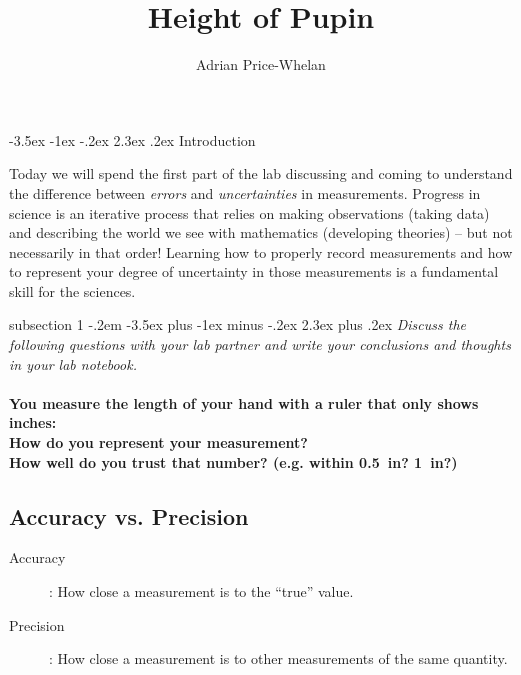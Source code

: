 \documentclass[12pt]{article}
\makeatletter
\newenvironment{problem}{\@startsection
       {subsection}
       {1}
       {-.2em}
       {-3.5ex plus -1ex minus -.2ex}
       {2.3ex plus .2ex}
       {\pagebreak[3]%
       \normalsize\bf\noindent{Problem }
       }
       }
       {%
       }
\renewcommand\section{\@startsection{section}{1}{\z@}%
                                  {-3.5ex \@plus -1ex \@minus -.2ex}%
                                  {2.3ex \@plus.2ex}%
                                  {\normalfont\large\bfseries}}
\makeatother
\begin{document}
\title{Height of Pupin}
\author{Adrian Price-Whelan}
\date{}%

\maketitle

\thispagestyle{empty}

\section{Introduction}

\indent\indent Today we will spend the first part of the lab discussing and coming to understand the difference between \emph{errors} and \emph{uncertainties} in measurements. Progress in science is an iterative process that relies on making observations (taking data) and describing the world we see with mathematics (developing theories) -- but not necessarily in that order! Learning how to properly record measurements and how to represent your degree of uncertainty in those measurements is a fundamental skill for the sciences.  

\begin{problem}{ }
	\textit{Discuss the following questions with your lab partner and write your conclusions and thoughts in your lab notebook.}  \\ \\
	\textbf{You measure the length of your hand with a ruler that only shows inches: } \\
	\indent\textbf{How do you represent your measurement?} \\
	\indent\textbf{How well do you trust that number? (e.g. within 0.5~in? 1~in?)} 
\end{problem}

\subsection{Accuracy vs. Precision}
\begin{description}
	\item[Accuracy]: How close a measurement is to the ``true'' value.
	\item[Precision]: How close a measurement is to other measurements of the same quantity. 
\end{description}
\end{document}
